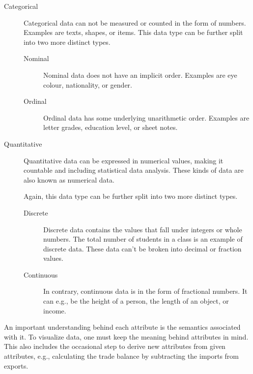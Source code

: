 \begin{description}
    \item[Categorical] Categorical data can not be measured or counted in the form of numbers.
        Examples are texts, shapes, or items.
        This data type can be further split into two more distinct types.

        \begin{description}
            \item[Nominal] Nominal data does not have an implicit order.
                Examples are eye colour, nationality, or gender.
            \item[Ordinal] Ordinal data has some underlying unarithmetic order.
                Examples are letter grades, education level, or sheet notes.
        \end{description}

    \item[Quantitative] Quantitative data can be expressed in numerical values, making it countable and including statistical data analysis.
        These kinds of data are also known as numerical data.

        Again, this data type can be further split into two more distinct types.

        \begin{description}
            \item[Discrete] Discrete data contains the values that fall under integers or whole numbers.
                The total number of students in a class is an example of discrete data.
                These data can’t be broken into decimal or fraction values.

            \item[Continuous] In contrary, continuous data is in the form of fractional numbers.
                It can e.g., be the height of a person, the length of an object, or income.
        \end{description}
\end{description}

\noindent
An important understanding behind each attribute is the semantics associated with it.
To visualize data, one must keep the meaning behind attributes in mind.
This also includes the occasional step to derive new attributes from given attributes, e.g., calculating the trade balance by subtracting the imports from exports.
